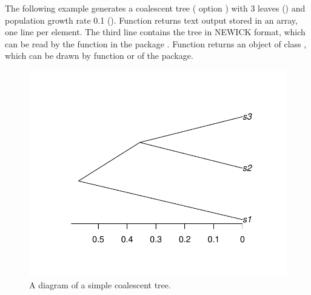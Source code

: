 The following example generates a coalescent tree ( option )
with 3 leaves ()
and population growth rate 0.1
(). Function  returns  text output
stored in an array, one line per element.
The third line contains the tree in NEWICK format, which can
be read by the  function in the  package
\citep{Paradis2004}.
Function  returns an object of class ,
which can be drawn by function  or 
of the  package.
\begin{figure}[h]
\begin{center}
\includegraphics[width=5.0in]{./phyclust-include/f-ms}
\caption{A diagram of a simple coalescent tree.}
\label{fig:ms}
\end{center}
\end{figure}




